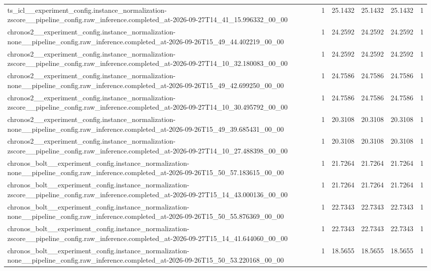 \begin{tabular}{llllll}
ts\_icl\_\_experiment\_config.instance\_normalization-zscore\_\_pipeline\_config.raw\_inference.completed\_at-2026-09-27T14\_41\_15.996332\_00\_00 & 1 & 25.1432 & 25.1432 & 25.1432 & 1 \\
chronos2\_\_experiment\_config.instance\_normalization-none\_\_pipeline\_config.raw\_inference.completed\_at-2026-09-26T15\_49\_44.402219\_00\_00 & 1 & 24.2592 & 24.2592 & 24.2592 & 1 \\
chronos2\_\_experiment\_config.instance\_normalization-zscore\_\_pipeline\_config.raw\_inference.completed\_at-2026-09-27T14\_10\_32.180083\_00\_00 & 1 & 24.2592 & 24.2592 & 24.2592 & 1 \\
chronos2\_\_experiment\_config.instance\_normalization-none\_\_pipeline\_config.raw\_inference.completed\_at-2026-09-26T15\_49\_42.699250\_00\_00 & 1 & 24.7586 & 24.7586 & 24.7586 & 1 \\
chronos2\_\_experiment\_config.instance\_normalization-zscore\_\_pipeline\_config.raw\_inference.completed\_at-2026-09-27T14\_10\_30.495792\_00\_00 & 1 & 24.7586 & 24.7586 & 24.7586 & 1 \\
chronos2\_\_experiment\_config.instance\_normalization-none\_\_pipeline\_config.raw\_inference.completed\_at-2026-09-26T15\_49\_39.685431\_00\_00 & 1 & 20.3108 & 20.3108 & 20.3108 & 1 \\
chronos2\_\_experiment\_config.instance\_normalization-zscore\_\_pipeline\_config.raw\_inference.completed\_at-2026-09-27T14\_10\_27.488398\_00\_00 & 1 & 20.3108 & 20.3108 & 20.3108 & 1 \\
chronos\_bolt\_\_experiment\_config.instance\_normalization-none\_\_pipeline\_config.raw\_inference.completed\_at-2026-09-26T15\_50\_57.183615\_00\_00 & 1 & 21.7264 & 21.7264 & 21.7264 & 1 \\
chronos\_bolt\_\_experiment\_config.instance\_normalization-zscore\_\_pipeline\_config.raw\_inference.completed\_at-2026-09-27T15\_14\_43.000136\_00\_00 & 1 & 21.7264 & 21.7264 & 21.7264 & 1 \\
chronos\_bolt\_\_experiment\_config.instance\_normalization-none\_\_pipeline\_config.raw\_inference.completed\_at-2026-09-26T15\_50\_55.876369\_00\_00 & 1 & 22.7343 & 22.7343 & 22.7343 & 1 \\
chronos\_bolt\_\_experiment\_config.instance\_normalization-zscore\_\_pipeline\_config.raw\_inference.completed\_at-2026-09-27T15\_14\_41.644060\_00\_00 & 1 & 22.7343 & 22.7343 & 22.7343 & 1 \\
chronos\_bolt\_\_experiment\_config.instance\_normalization-none\_\_pipeline\_config.raw\_inference.completed\_at-2026-09-26T15\_50\_53.220168\_00\_00 & 1 & 18.5655 & 18.5655 & 18.5655 & 1 \\

\end{tabular}

